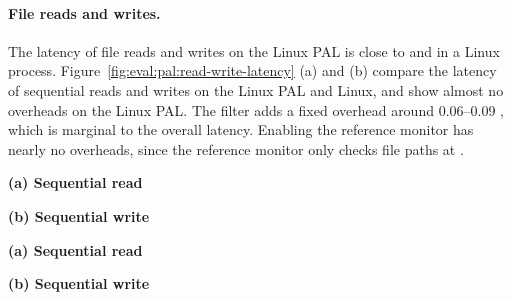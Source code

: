 \paragraph{File reads and writes.}
The latency of file reads and writes on the Linux PAL
is close to
 and 
in a Linux process.
Figure~\ref{fig:eval:pal:read-write-latency} (a) and (b) compare the latency of sequential reads and writes 
on the Linux PAL and Linux,
and show almost no overheads on the Linux PAL.
The \seccomp{} filter adds a fixed overhead
around 0.06--0.09 \msec{},
which is marginal to the overall latency.
Enabling the reference monitor has nearly no overheads,
since the reference monitor only checks file paths at .
 


\begin{figure*}[t!]
\centering
\footnotesize
{}
\parbox{0.49\textwidth}{\centering\bf (a) Sequential read}
\parbox{0.49\textwidth}{\centering\bf (b) Sequential write}
\caption{Latency of sequential  and  on the Linux PAL,
versus  and  on Linux.
Lower is better.
Figure (a) and (b) respectively compares  and  on the Linux PAL,
with and without a \seccomp{} filter ({\bf +SC})
and reference monitor ({\bf +RM}), against  and  on Linux.}
\label{fig:eval:pal:read-write-latency}
\end{figure*}

\begin{figure*}[t!]
\centering
\footnotesize
{}
\parbox{0.49\textwidth}{\centering\bf (a) Sequential read}
\parbox{0.49\textwidth}{\centering\bf (b) Sequential write}
\caption{Latency of sequential  and  on the SGX PAL,
versus the Linux PAL and Linux.
Lower is better.
Figure (a) and (b) respectively compares  and  on the SGX PAL,
with and without integrity checks ({\bf +CHK})
and reference monitor ({\bf +RM}), against the Linux PAL and  and  on Linux. The current design does not support integrity checks for .}
\label{fig:eval:pal:sgx-read-write-latency}
\end{figure*}


